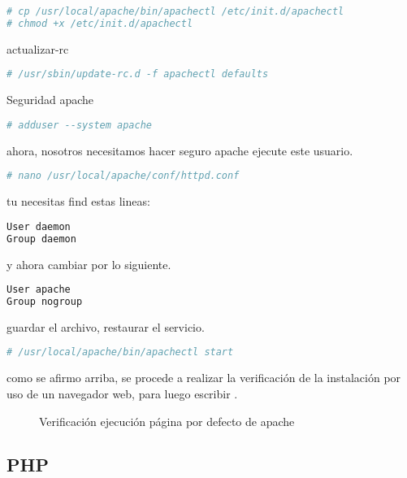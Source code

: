 \begin{lstlisting}[language=bash, caption={}]
# cp /usr/local/apache/bin/apachectl /etc/init.d/apachectl
# chmod +x /etc/init.d/apachectl
\end{lstlisting}

actualizar-rc

\begin{lstlisting}[language=bash, caption={}]
# /usr/sbin/update-rc.d -f apachectl defaults
\end{lstlisting}

Seguridad apache

\begin{lstlisting}[language=bash, caption={}]
# adduser --system apache
\end{lstlisting}

ahora, nosotros necesitamos hacer seguro apache ejecute este usuario.

\begin{lstlisting}[language=bash, caption={}]
# nano /usr/local/apache/conf/httpd.conf
\end{lstlisting}

tu necesitas find estas lineas:

\begin{lstlisting}[language=bash, caption={}]
User daemon
Group daemon
\end{lstlisting}

y ahora cambiar por lo siguiente.

\begin{lstlisting}[language=bash, caption={}]
User apache
Group nogroup
\end{lstlisting}

guardar el archivo, restaurar el servicio.

\begin{lstlisting}[language=bash, caption={}]
# /usr/local/apache/bin/apachectl start
\end{lstlisting}

como se afirmo arriba, se procede a realizar la verificación de la instalación
por uso de un navegador web, para luego escribir . 

\begin{figure}[!ht]
\centering
		\caption{Verificación ejecución página por defecto de apache}
\end{figure}


\subsection{PHP}


